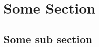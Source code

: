 \documentclass[a4paper,oneside,12pt,final]{article}
\begin{document}
 


\tableofcontents
\newpage

\section{Some Section} 
\subsection{Some sub section}
\end{document}
